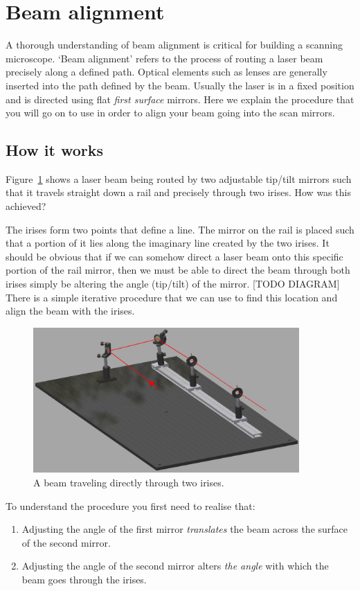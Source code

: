 \documentclass[a4paper]{report}
\begin{document}
\clearpage
\section{Beam alignment}

A thorough understanding of beam alignment is critical for building a scanning microscope. 
`Beam alignment' refers to the process of routing a laser beam precisely along a defined path. 
Optical elements such as lenses are generally inserted into the path defined by the beam. 
Usually the laser is in a fixed position and is directed using flat \textit{first surface} mirrors.
Here we explain the procedure that you will go on to use in order to align your beam going into the scan mirrors.


\subsection{How it works}
Figure~\ref{fig:ex1} shows a laser beam being routed by two adjustable tip/tilt mirrors such that it travels straight down a rail and precisely through two irises. How was this achieved?

The irises form two points that define a line. 
The mirror on the rail is placed such that a portion of it lies along the imaginary line created by the two irises. 
It should be obvious that if we can somehow direct a laser beam onto this specific portion of the rail mirror, then we must be able to direct the beam through both irises simply be altering the angle (tip/tilt) of the mirror. [TODO DIAGRAM] There is a simple iterative procedure that we can use to find this location and align the beam with the irises.


\begin{figure}[h]
\center
\includegraphics[width=4in]{alignment_CAD_01.eps}
\caption{A beam traveling directly through two irises.}
\label{fig:ex1}
\end{figure}

To understand the procedure you first need to realise that:
\begin{enumerate}
\setlength\itemsep{0.1em}
\item Adjusting the angle of the first mirror \textit{translates} the beam across the surface of the second mirror.
\item Adjusting the angle of the second mirror alters \textit{the angle} with which the beam goes through the irises. 
\end{enumerate}
\end{document}
